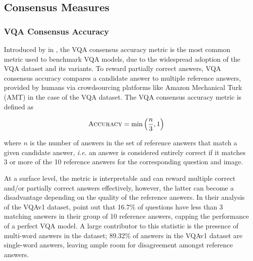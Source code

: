 


\subsection{Consensus Measures}
\label{subsection:consensus_measures}

\subsubsection{VQA Consensus Accuracy}
Introduced by \citeauthor{antol2015vqa} in \citeyear{antol2015vqa}, the VQA consensus accuracy metric is the most common metric used to benchmark VQA models, due to the widespread adoption of the VQA dataset and its variants. To reward partially correct answers, VQA consensus accuracy compares a candidate answer to multiple reference answers, provided by humans via crowdsourcing platforms like Amazon Mechanical Turk (AMT) in the case of the VQA dataset. The VQA consensus accuracy metric is defined as

\begin{equation}
    \textsc{Accuracy} = \min \left( \frac{n}{3}, 1 \right)
    \label{eq:vqa_consensus_accuracy}
\end{equation}

where \(n\) is the number of answers in the set of reference answers that match a given candidate answer, \textit{i.e.} an answer is considered entirely correct if it matches 3 or more of the 10 reference answers for the corresponding question and image.

At a surface level, the metric is interpretable and can reward multiple correct and/or partially correct answers effectively, however, the latter can become a disadvantage depending on the quality of the reference answers. In their analysis of the VQAv1 dataset, \citeauthor{kafle2017visual} point out that 16.7\% of questions have less than 3 matching answers in their group of 10 reference answers, capping the performance of a perfect VQA model. A large contributor to this statistic is the presence of multi-word answers in the dataset; 89.32\% of answers in the VQAv1 dataset are single-word answers, leaving ample room for disagreement amongst reference answers.

